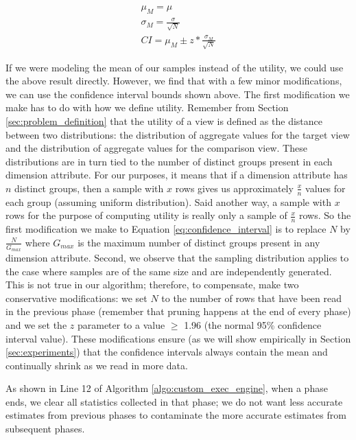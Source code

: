 \begin{eqnarray}
\label{eqnarray:mean_and_variance}
\mu_M = \mu \label{eq:mean}\\
\sigma_{M} = \frac{\sigma}{\sqrt{N}} \label{eq:variance}\\
CI = \mu_M \pm z \ast \frac{\sigma_M}{\sqrt{N}}\label{eq:confidence_interval}
\end{eqnarray}

If we were modeling the mean of our samples instead of the utility, we could use
the above result directly.
However, we find that with a few minor modifications, we can use the confidence
interval bounds shown above.
The first modification we make has to do with how we define utility.
Remember from Section \ref{sec:problem_definition} that the utility of a view is
defined as the distance between two distributions: the distribution of aggregate values for the
target view and the distribution of aggregate values for the comparison view.
These distributions are in turn tied to the number of distinct groups present in
each dimension attribute.
For our purposes, it means that if a dimension attribute has $n$ distinct
groups, then a sample with $x$ rows gives us approximately $\frac{x}{n}$ values
for each group (assuming uniform distribution).
Said another way, a sample with $x$ rows for the purpose of computing utility is
really only a sample of $\frac{x}{n}$ rows.
So the first modification we make to Equation \ref{eq:confidence_interval} is to
replace $N$ by $\frac{N}{G_{max}}$ where $G_{max}$ is the maximum number of
distinct groups present in any dimension attribute.
Second, we observe that the sampling distribution applies to the case where
samples are of the same size and are independently generated.
This is not true in our algorithm; therefore, to compensate, make two
conservative modifications: we set $N$ to the number of rows that
have been read in the previous phase (remember that pruning happens at the end
of every phase) and we set the $z$ parameter to a value $\geq$ 1.96 (the normal
95\% confidence interval value). These modifications ensure (as we will show
empirically in Section \ref{sec:experiments}) that the confidence intervals
always contain the mean and continually shrink as we read in more data.

As shown in Line 12 of Algorithm \ref{algo:custom_exec_engine},
when a phase ends, we clear all statistics collected in that phase; we do not
want less accurate estimates from previous phases to contaminate the more
accurate estimates from subsequent phases. 



